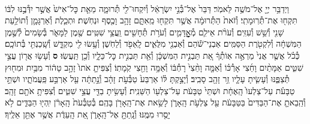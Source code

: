 \documentclass[twoside, openany, parskip=half, 11pt]{book}
\begin{document}
\begin{footnotesize}
\begin{multicols}{2}
\\
וַיְדַבֵּ֥ר יְיָ֖ אֶל־מֹשֶׁ֥ה לֵּאמֹֽר׃ דַּבֵּר֙ אֶל־בְּ֯נֵ֣י יִשְׂרָאֵ֔ל וְ֯יִקְחוּ־לִ֖י תְּ֯רוּמָ֑ה מֵאֵ֤ת כׇּל־אִישׁ֙ אֲשֶׁ֣ר יִדְּ֯בֶ֣נּוּ לִבּ֔וֹ תִּקְח֖וּ אֶת־תְּ֯רֽוּמָתִֽי׃ וְ֯זֹאת֙ הַתְּ֯רוּמָ֔ה אֲשֶׁ֥ר תִּקְח֖וּ מֵֽאִתָּ֑ם זָהָ֥ב וָכֶ֖סֶף וּנְחֹֽשֶׁת׃ וּתְכֵ֧לֶת וְ֯אַרְגָּמָ֛ן וְ֯תוֹלַ֥עַת שָׁנִ֖י וְ֯שֵׁ֥שׁ וְ֯עִזִּֽים׃ וְ֯עֹרֹ֨ת אֵילִ֧ם מְ֯אׇׇׇׇׇׇׇׇׇׇׇׇדָּמִ֛ים וְ֯עֹרֹ֥ת תְּ֯חָשִׁ֖ים וַֽעֲצֵ֥י שִׁטִּֽים׃  שֶׁ֖מֶן לַמָּאֹ֑ר בְּ֯שָׂמִים֙ לְ֯שֶׁ֣מֶן הַמִּשְׁחָ֔ה וְ֯לִקְטֹ֖רֶת הַסַּמִּֽים׃ אַבְנֵי־שֹׁ֕הַם וְ֯אַבְנֵ֖י מִלֻּאִ֑ים לָֽאֵפֹ֖ד וְ֯לַחֹֽשֶׁן׃ וְ֯עָ֥שׂוּ לִ֖י מִקְדָּ֑שׁ וְ֯שָֽׁכַנְתִּ֖י בְּ֯תוֹכָֽם׃ כְּ֯כֹ֗ל אֲשֶׁ֤ר אֲנִי֙ מַרְאֶ֣ה אֽוֹתְ֯ךָ֔ אֵ֚ת תַּבְנִ֣ית הַמִּשְׁכָּ֔ן וְ֯אֵ֖ת תַּבְנִ֣ית כׇּל־כֵּלָ֑יו וְ֯כֵ֖ן תַּֽעֲשֽׂוּ׃ \textbf{ס}  וְ֯עָשׂ֥וּ אֲר֖וֹן עֲצֵ֣י שִׁטִּ֑ים אַמָּתַ֨יִם וָחֵ֜צִי אָרְ֯כּ֗וֹ וְ֯אַמָּ֤ה וָחֵ֨צִי֙ רָחְ֯בּ֔וֹ וְ֯אַמָּ֥ה וָחֵ֖צִי קֹֽמָתֽוֹ׃ וְ֯צִפִּיתָ֤ אֹתוֹ֙ זָהָ֣ב טָה֔וֹר מִבַּ֥יִת וּמִח֖וּץ תְּ֯צַפֶּ֑נּוּ וְ֯עָשִׂ֧יתָ עָלָ֛יו זֵ֥ר זָהָ֖ב סָבִֽיב׃ וְ֯יָצַ֣קְתָּ לּ֗וֹ אַרְבַּע֙ טַבְּ֯עֹ֣ת זָהָ֔ב וְ֯נָ֣תַתָּ֔ה עַ֖ל אַרְבַּ֣ע פַּֽעֲמֹתָ֑יו וּשְׁתֵּ֣י טַבָּעֹ֗ת עַל־צַלְעוֹ֙ הָֽאֶחָ֔ת וּשְׁתֵּי֙ טַבָּעֹ֔ת עַל־צַלְע֖וֹ הַשֵּׁנִֽית׃ וְ֯עָשִׂ֥יתָ בַדֵּ֖י עֲצֵ֣י שִׁטִּ֑ים וְ֯צִפִּיתָ֥ אֹתָ֖ם זָהָֽב׃ וְ֯הֵֽבֵאתָ֤ אֶת־הַבַּדִּים֙ בַּטַּבָּעֹ֔ת עַ֖ל צַלְעֹ֣ת הָֽאָרֹ֑ן לָשֵׂ֥את אֶת־הָֽאָרֹ֖ן בָּהֶֽם׃ בְּ֯טַבְּ֯עֹת֙ הָֽאָרֹ֔ן יִֽהְי֖וּ הַבַּדִּ֑ים לֹ֥א יָסֻ֖רוּ מִמֶּֽנּוּ׃ וְ֯נָֽתַתָּ֖ אֶל־הָֽאָרֹ֑ן אֵ֚ת הָֽעֵדֻ֔ת אֲשֶׁ֥ר אֶתֵּ֖ן אֵלֶֽיךָ׃


\end{multicols}
\end{footnotesize}
\end{document}
